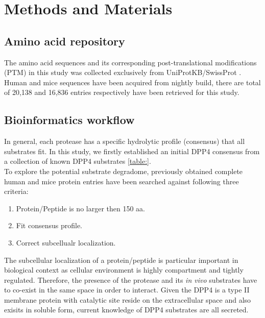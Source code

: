 \section{Methods and Materials}

\subsection{Amino acid repository}
The amino acid sequences and its corresponding post-translational modifications (PTM) in this study was collected exclusively from UniProtKB/SwissProt \cite{Magrane:2011fv}. Human and mice sequences have been acquired from nightly build, there are total of 20,138 and 16,836 entries respectively have been retrieved for this study. 
\\
\subsection{Bioinformatics workflow}
In general, each protease has a specific hydrolytic profile (consensus) that all substrates fit. In this study, we firstly established an initial DPP4 consensus from a collection of known DPP4 substrates \ref{table:}. 
\\
To explore the potential substrate degradome, previously obtained complete human and mice protein entries have been searched against following three criteria:
\begin{enumerate}
\item Protein/Peptide is no larger then 150 aa. 
\item Fit consensus profile.
\item Correct subcellualr localization.
\end{enumerate}

The subcellular localization of a protein/peptide is particular important in biological context as cellular environment is highly compartment and tightly regulated. Therefore, the presence of the protease and its \textit{in vivo} substrates have to co-exist in the same space in order to interact. Given the DPP4 is a type II membrane protein with catalytic site reside on the extracellular space and also exisits in soluble form, current knowledge of DPP4 substrates are all secreted. 



